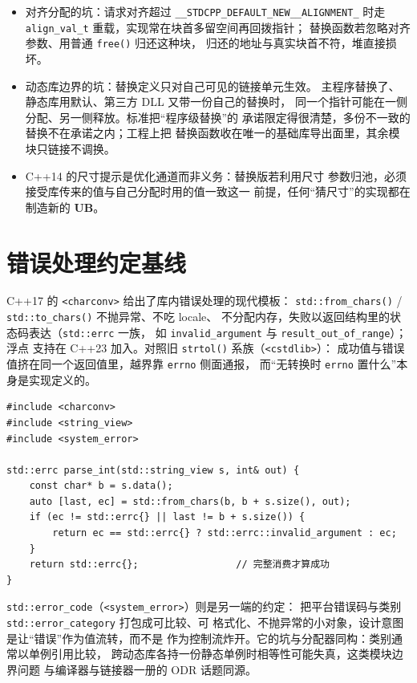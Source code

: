 \documentclass[12pt,a4paper,fontset=fandol]{ctexbook}
\newcommand{\cpp}[1]{C++#1}
\newcommand{\Fn}[1]{\texttt{#1()}}
\newcommand{\Tp}[1]{\texttt{#1}}
\newcommand{\Bk}{\discretionary{}{}{}}
\newcommand{\UB}{\textbf{\textsf{UB}}}
\newcommand{\Hdr}[1]{\texttt{<#1>}}
\newcommand{\Feat}[1]{\texttt{#1}}
\begin{document}
\begin{itemize}
\item 对齐分配的坑：请求对齐超过 \Feat{\_\_STDCPP\_DEFAULT\_NEW\_\Bk\_ALIGNMENT\_}
    时走 \Tp{align\_val\_t} 重载，实现常在块首多留空间再回拨指针；
    替换函数若忽略对齐参数、用普通 \Fn{free} 归还这种块，
    归还的地址与真实块首不符，堆直接损坏。
\item 动态库边界的坑：替换定义只对自己可见的链接单元生效。
    主程序替换了、静态库用默认、第三方 DLL 又带一份自己的替换时，
    同一个指针可能在一侧分配、另一侧释放。标准把“程序级替换”的
    承诺限定得很清楚，多份不一致的替换不在承诺之内；工程上把
    替换函数收在唯一的基础库导出面里，其余模块只链接不调换。
\item \cpp{14} 的尺寸提示是优化通道而非义务：替换版若利用尺寸
    参数归池，必须接受库传来的值与自己分配时用的值一致这一
    前提，任何“猜尺寸”的实现都在制造新的 \UB{}。
\end{itemize}

\section{错误处理约定基线}\label{sec:ub14-error-baseline}

\cpp{17} 的 \Hdr{charconv} 给出了库内错误处理的现代模板：
\Fn{std::from\_chars} / \Fn{std::to\_chars} 不抛异常、不吃 locale、
不分配内存，失败以返回结构里的状态码表达（\Tp{std::errc} 一族，
如 \Tp{invalid\_argument} 与 \Tp{result\_out\_of\_range}）；浮点
支持在 \cpp{23} 加入。对照旧 \Fn{strtol} 系族（\Hdr{cstdlib}）：
成功值与错误值挤在同一个返回值里，越界靠 \Feat{errno} 侧面通报，
而“无转换时 \Feat{errno} 置什么”本身是实现定义的。

\begin{lstlisting}[style=cppstyle, caption={\Tp{from\_chars}：状态即返回值，没有全局副作用}]
#include <charconv>
#include <string_view>
#include <system_error>

std::errc parse_int(std::string_view s, int& out) {
    const char* b = s.data();
    auto [last, ec] = std::from_chars(b, b + s.size(), out);
    if (ec != std::errc{} || last != b + s.size()) {
        return ec == std::errc{} ? std::errc::invalid_argument : ec;
    }
    return std::errc{};                 // 完整消费才算成功
}
\end{lstlisting}

\Tp{std::error\_code}（\Hdr{system\_error}）则是另一端的约定：
把平台错误码与类别 \Tp{std::error\_category} 打包成可比较、可
格式化、不抛异常的小对象，设计意图是让“错误”作为值流转，而不是
作为控制流炸开。它的坑与分配器同构：类别通常以单例引用比较，
跨动态库各持一份静态单例时相等性可能失真，这类模块边界问题
与编译器与链接器一册的 ODR 话题同源。
\end{document}
